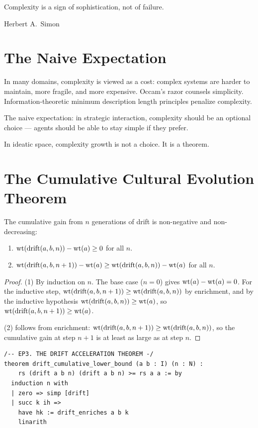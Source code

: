 \epigraph{Complexity is a sign of sophistication, not of failure.}{Herbert A.\ Simon}

\section{The Naive Expectation}

In many domains, complexity is viewed as a cost: complex systems are harder to maintain, more fragile, and more expensive. Occam's razor counsels simplicity. Information-theoretic minimum description length principles penalize complexity.

The naive expectation: in strategic interaction, complexity should be an optional choice --- agents should be able to stay simple if they prefer.

In ideatic space, complexity growth is not a choice. It is a theorem.

\section{The Cumulative Cultural Evolution Theorem}

\begin{theorem}
\label{thm:cultural-evolution}
The cumulative gain from $n$ generations of drift is non-negative and non-decreasing:
\begin{enumerate}
\item $\operatorname{wt}(\text{drift}(a,b,n)) - \operatorname{wt}(a) \geq 0$ for all $n$.
\item $\operatorname{wt}(\text{drift}(a,b,n+1)) - \operatorname{wt}(a) \geq \operatorname{wt}(\text{drift}(a,b,n)) - \operatorname{wt}(a)$ for all $n$.
\end{enumerate}
\end{theorem}

\begin{proof}
(1) By induction on $n$. The base case ($n=0$) gives $\operatorname{wt}(a) - \operatorname{wt}(a) = 0$. For the inductive step, $\operatorname{wt}(\text{drift}(a,b,n+1)) \geq \operatorname{wt}(\text{drift}(a,b,n))$ by enrichment, and by the inductive hypothesis $\operatorname{wt}(\text{drift}(a,b,n)) \geq \operatorname{wt}(a)$, so $\operatorname{wt}(\text{drift}(a,b,n+1)) \geq \operatorname{wt}(a)$.

(2) follows from enrichment: $\operatorname{wt}(\text{drift}(a,b,n+1)) \geq \operatorname{wt}(\text{drift}(a,b,n))$, so the cumulative gain at step $n+1$ is at least as large as at step $n$.
\end{proof}

\begin{lstlisting}
/-- EP3. THE DRIFT ACCELERATION THEOREM -/
theorem drift_cumulative_lower_bound (a b : I) (n : N) :
    rs (drift a b n) (drift a b n) >= rs a a := by
  induction n with
  | zero => simp [drift]
  | succ k ih =>
    have hk := drift_enriches a b k
    linarith
\end{lstlisting}

